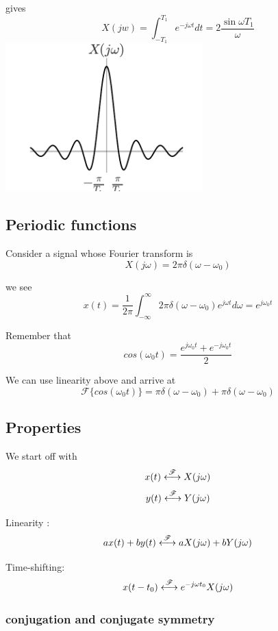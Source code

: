 gives 
\[
X(jw) = \int_{-T_1}^{T_1} e^{-j\omega t} dt = 2 \frac{\sin \omega T_1}{\omega}
\]
\includegraphics[width=3in]{notes.02.sinc.pdf}


\subsection{Periodic functions}
Consider a signal whose Fourier transform is 
\[
X(j\omega) = 2 \pi \delta(\omega - \omega_0)
\]

we see
\[
x(t) = \frac{1}{2\pi}\int_{-\infty}^{\infty} 2\pi \delta(\omega - \omega_0) e^{j \omega t} d\omega = e^{j\omega_0  t}
\]


Remember that
\[
cos(\omega_0 t) = \frac{e^{j\omega_0 t} + e^{-j\omega_0 t}}{2}
\]

We can use linearity above and arrive at 
\[
\mathscr{F} \{ cos(\omega_0 t) \} = \pi \delta(\omega - \omega_0) + \pi \delta(\omega - \omega_0)
\]


\subsection{Properties}
We start off with 
\[ 
x(t) \stackrel{\mathscr{F}}{\longleftrightarrow} X(j\omega)
\]
\[ 
y(t) \stackrel{\mathscr{F}}{\longleftrightarrow} Y(j\omega)
\]

Linearity : 
\[
ax(t) + by(t) \stackrel{\mathscr{F}}{\longleftrightarrow} aX(j\omega) + bY(j\omega)
\]

Time-shifting: 
\[
x(t - t_0) \stackrel{\mathscr{F}}{\longleftrightarrow} e^{-j\omega t_0}X(j\omega)
\]

\subsubsection{conjugation and conjugate symmetry}

